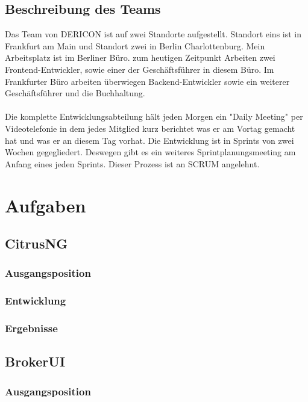 \documentclass{article}
\begin{document}
    \subsection{Beschreibung des Teams}

    Das Team von DERICON ist auf zwei Standorte aufgestellt. Standort eins ist in Frankfurt am Main und Standort zwei in Berlin Charlottenburg.
    Mein Arbeitsplatz ist im Berliner Büro. zum heutigen Zeitpunkt Arbeiten zwei Frontend-Entwickler, sowie einer der Geschäftsführer in diesem Büro.
    Im Frankfurter Büro arbeiten überwiegen Backend-Entwickler sowie ein weiterer Geschäftsführer und die Buchhaltung.
    \\ \\
    Die komplette Entwicklungsabteilung hält jeden Morgen ein "Daily Meeting" per Videotelefonie in dem jedes Mitglied kurz berichtet
    was er am Vortag gemacht hat und was er an diesem Tag vorhat.
    Die Entwicklung ist in Sprints von zwei Wochen gegegliedert. Deswegen gibt es ein weiteres Sprintplanungsmeeting am Anfang eines jeden Sprints.
    Dieser Prozess ist an SCRUM angelehnt.

    \section{Aufgaben}

    \subsection{CitrusNG}

    \subsubsection{Ausgangsposition}

    \subsubsection{Entwicklung}

    \subsubsection{Ergebnisse}

    \subsection{BrokerUI}

    \subsubsection{Ausgangsposition}
\end{document}
